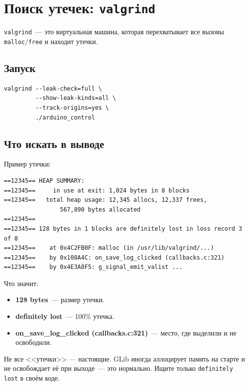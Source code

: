 \section{Поиск утечек: \texttt{valgrind}}
\label{sec:debug-valgrind}

\texttt{valgrind}~--- это виртуальная машина,
которая перехватывает все вызовы
\texttt{malloc}/\texttt{free} и находит утечки.

\subsection{Запуск}

\begin{verbatim}
valgrind --leak-check=full \
         --show-leak-kinds=all \
         --track-origins=yes \
         ./arduino_control
\end{verbatim}

\subsection{Что искать в выводе}

Пример утечки:

\begin{verbatim}
==12345== HEAP SUMMARY:
==12345==     in use at exit: 1,024 bytes in 8 blocks
==12345==   total heap usage: 12,345 allocs, 12,337 frees,
                567,890 bytes allocated
==12345==
==12345== 128 bytes in 1 blocks are definitely lost in loss record 3 of 8
==12345==    at 0x4C2FB0F: malloc (in /usr/lib/valgrind/...)
==12345==    by 0x108A4C: on_save_log_clicked (callbacks.c:321)
==12345==    by 0x4E3A8F5: g_signal_emit_valist ...
\end{verbatim}

Что значит:

\begin{itemize}
    \item \textbf{128 bytes}~--- размер утечки.
    \item \textbf{definitely lost}~--- 100\% утечка.
    \item \textbf{on\_save\_log\_clicked (callbacks.c:321)}~---
          место, где выделили и не освободили.
\end{itemize}

\begin{warnbox}
Не все <<утечки>> — настоящие. GLib иногда
аллоцирует память на старте и
не освобождает её при выходе~---
это нормально. Ищите только
\texttt{definitely lost} в своём коде.
\end{warnbox}


